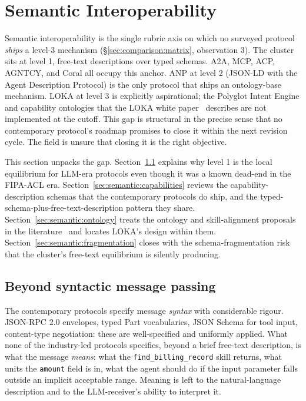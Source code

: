 \section{Semantic Interoperability}
\label{sec:semantic}

Semantic interoperability is the single rubric axis on which no
surveyed protocol \emph{ships} a level-3 mechanism
(\S\ref{sec:comparison:matrix}, observation 3). The cluster
sits at level 1, free-text descriptions over typed schemas.
A2A, MCP, ACP, AGNTCY, and Coral all occupy this anchor. ANP at
level 2 (JSON-LD with the Agent Description Protocol) is the only
protocol that ships an ontology-base mechanism. LOKA at level 3
is explicitly aspirational; the Polyglot Intent Engine and
capability ontologies that the LOKA white paper~\cite{spec_loka}
describes are not implemented at the cutoff. This gap is
structural in the precise sense that no contemporary protocol's
roadmap promises to close it within the next revision cycle.
The field is unsure that closing it is the right objective.

This section unpacks the gap. Section~\ref{sec:semantic:syntactic}
explains why level 1 is the local equilibrium for LLM-era
protocols even though it was a known dead-end in the FIPA-ACL era.
Section~\ref{sec:semantic:capabilities} reviews the
capability-description schemas that the contemporary protocols
do ship, and the typed-schema-plus-free-text-description pattern
they share. Section~\ref{sec:semantic:ontology} treats the
ontology and skill-alignment proposals in the
literature~\cite{semantic_driven, beyond_message_passing} and
locates LOKA's design within them. Section~\ref{sec:semantic:fragmentation}
closes with the schema-fragmentation risk that the cluster's
free-text equilibrium is silently producing.

\subsection{Beyond syntactic message passing}
\label{sec:semantic:syntactic}

The contemporary protocols specify message \emph{syntax} with
considerable rigour. JSON-RPC 2.0 envelopes, typed Part vocabularies,
JSON Schema for tool input, content-type negotiation: these
are well-specified and uniformly applied. What none of the
industry-led protocols specifies, beyond a brief free-text
description, is what the message \emph{means}: what the
\texttt{find\_billing\_record} skill returns, what units the
\texttt{amount} field is in, what the agent should do if the
input parameter falls outside an implicit acceptable range.
Meaning is left to the natural-language description and to
the LLM-receiver's ability to interpret it.

